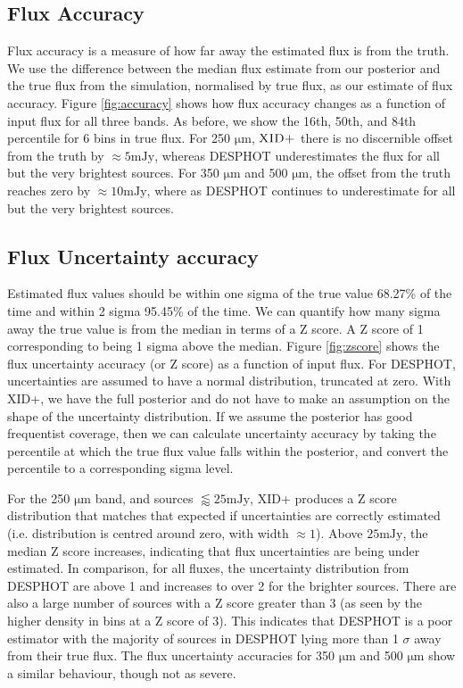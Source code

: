 \documentclass[useAMS,usenatbib]{mnras}
\begin{document}
\subsection{Flux Accuracy}
Flux accuracy is a measure of how far away the estimated flux is from the truth. We use the difference between the median flux estimate from our posterior and the true flux from the simulation, normalised by true flux, as our estimate of flux accuracy. Figure \ref{fig:accuracy} shows how flux accuracy changes as a function of input flux for all three bands. As before, we show the 16th, 50th, and 84th percentile for 6 bins in true flux. For 250 $\mathrm{\mu m}$, $\textsc{XID+}$ there is no discernible offset from the truth by $\approx 5 \mathrm{mJy}$, whereas \textsc{DESPHOT} underestimates the flux for all but the very brightest sources. For 350 $\mathrm{\mu m}$ and 500 $\mathrm{\mu m}$, the offset from the truth reaches zero by $\approx10 \mathrm{mJy}$, where as \textsc{DESPHOT} continues to underestimate for all but the very brightest sources.

\subsection{Flux Uncertainty accuracy}
Estimated flux values should be within one sigma of the true value 68.27\% of the time and within 2 sigma 95.45\% of the time. We can quantify how many sigma away the true value is from the median in terms of a Z score. A Z score of 1 corresponding to being 1 sigma above the median. Figure \ref{fig:zscore} shows the flux uncertainty accuracy (or Z score) as a function of input flux. For \textsc{DESPHOT}, uncertainties are assumed to have a normal distribution, truncated at zero. With \textsc{XID+}, we have the full posterior and do not have to make an assumption on the shape of the uncertainty distribution. If we assume the posterior has good frequentist coverage, then we can calculate uncertainty accuracy by taking the percentile at which the true flux value falls within the posterior, and convert the percentile to a corresponding sigma level.

For the 250 $\mathrm{\mu m}$ band, and sources $\lessapprox25\mathrm{m Jy}$, \textsc{XID+} produces a Z score distribution that matches that expected if uncertainties are correctly estimated (i.e. distribution is centred around zero, with width $\approx 1$). Above $25\mathrm{mJy}$, the median Z score increases, indicating that flux uncertainties are being under estimated. In comparison, for all fluxes, the uncertainty distribution from \textsc{DESPHOT} are above 1 and increases to over 2 for the brighter sources. There are also a large number of sources with a Z score greater than 3 (as seen by the higher density in bins at a Z score of 3). This indicates that \textsc{DESPHOT} is a poor estimator with the majority of sources in \textsc{DESPHOT} lying more than 1 $\sigma$ away from their true flux. The flux uncertainty accuracies for 350 $\mathrm{\mu m}$ and 500 $\mathrm{\mu m}$ show a similar behaviour, though not as severe.
\end{document}
